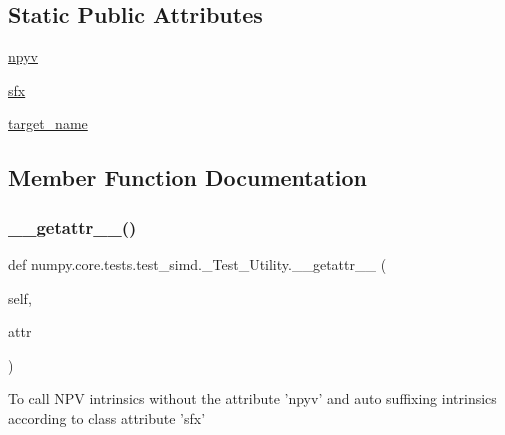 \subsection*{Static Public Attributes}
\begin{DoxyCompactItemize}
\item 
\hyperlink{classnumpy_1_1core_1_1tests_1_1test__simd_1_1__Test__Utility_a9df8b4b76eaed4f37ebfa5033ff3ce41}{npyv}
\item 
\hyperlink{classnumpy_1_1core_1_1tests_1_1test__simd_1_1__Test__Utility_a1b27fa915c64d7dd9fa5170c74c99b01}{sfx}
\item 
\hyperlink{classnumpy_1_1core_1_1tests_1_1test__simd_1_1__Test__Utility_af53cd489742ef46d9ad3a5287de19268}{target\+\_\+name}
\end{DoxyCompactItemize}


\subsection{Member Function Documentation}
\mbox{\label{classnumpy_1_1core_1_1tests_1_1test__simd_1_1__Test__Utility_afc048dd55550c5cdd55129a98d117fb4}} 
\subsubsection{\texorpdfstring{\+\_\+\+\_\+getattr\+\_\+\+\_\+()}{\_\_getattr\_\_()}}
{\footnotesize\ttfamily def numpy.\+core.\+tests.\+test\+\_\+simd.\+\_\+\+Test\+\_\+\+Utility.\+\_\+\+\_\+getattr\+\_\+\+\_\+ (\begin{DoxyParamCaption}\item[{}]{self,  }\item[{}]{attr }\end{DoxyParamCaption})}

\begin{DoxyVerb}To call NPV intrinsics without the attribute 'npyv' and
auto suffixing intrinsics according to class attribute 'sfx'
\end{DoxyVerb}
 

